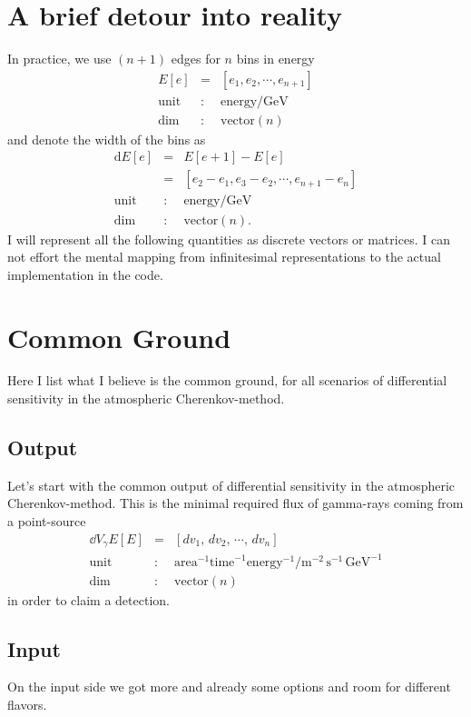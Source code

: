 \documentclass{article}%
\begin{document}
\section{A brief detour into reality}
%
In practice, we use $(n+1)$ edges for $n$ bins in energy
%
\begin{eqnarray*}
E[e] &=& [e_1, e_2, \cdots, e_{n+1}]\\
\text{unit} &:& \text{energy} / \text{GeV}\\
\text{dim} &:& \text{vector}(n)
\end{eqnarray*}
%
and denote the width of the bins as
%
\begin{eqnarray*}
\text{d}E[e] &=& E[e+1] - E[e]\\
&=& [e_2-e_1, e_3-e_2, \cdots, e_{n+1}-e_n]\\
\text{unit} &:& \text{energy} / \text{GeV}\\
\text{dim} &:& \text{vector}(n).
\end{eqnarray*}
%
I will represent all the following quantities as discrete vectors or matrices.
%
I can not effort the mental mapping from infinitesimal representations to the actual implementation in the code.
%
\section{Common Ground}
\label{SecCommonGround}
%
Here I list what I believe is the common ground, for all scenarios of differential sensitivity in the atmospheric Cherenkov-method.
%
\subsection{Output}
%
Let's start with the common output of differential sensitivity in the atmospheric Cherenkov-method.
%
This is the minimal required flux of gamma-rays coming from a point-source
%
\begin{eqnarray*}
\dd{V_\gamma}{E}[E] &=& [dv_1, \, dv_2, \, \cdots, \, dv_n]\\
\text{unit} &:& \text{area}^{-1} \text{time}^{-1} \text{energy}^{-1} / \text{m}^{-2}\,\text{s}^{-1}\,\text{GeV}^{-1}\\
\text{dim} &:& \text{vector}(n)
\end{eqnarray*}
%
in order to claim a detection.
%
\subsection{Input}
%
On the input side we got more and already some options and room for different flavors.
%
\end{document}
